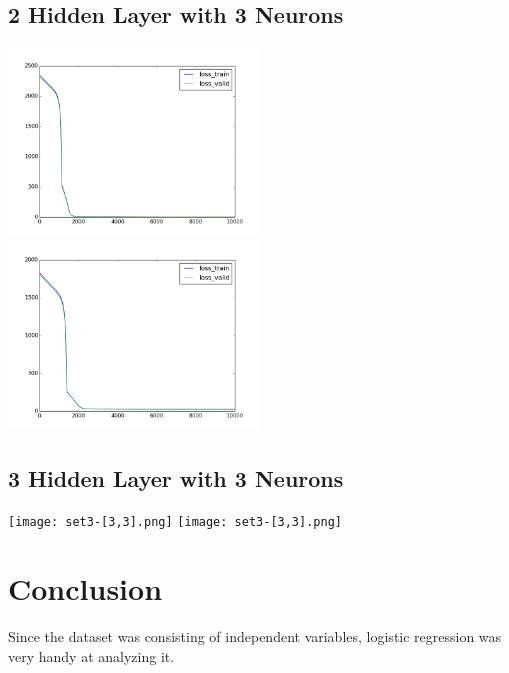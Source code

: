 \documentclass[conference]{IEEEtran}
\begin{document}
\subsection{2 Hidden Layer with 3 Neurons}

\includegraphics[width=0.5\textwidth]{set1-[3,3].png}
\includegraphics[width=0.5\textwidth]{set2-[3,3].png}

\subsection{3 Hidden Layer with 3 Neurons}

\texttt{[image: set3-[3,3].png]}
\texttt{[image: set3-[3,3].png]}



\section{Conclusion}
Since the dataset  was consisting of independent variables, logistic regression was very handy at analyzing it.
\end{document}
